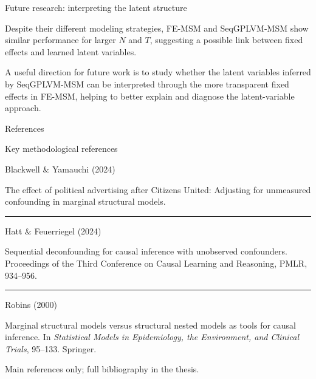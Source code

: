 \documentclass[aspectratio=169,12pt]{beamer}
\newcommand{\teal}[1]{\textcolor{PrimerTeal}{#1}}
\newcommand{\muted}[1]{\textcolor{PrimerMuted}{#1}}
\newcommand{\spacedparagraph}[1]{\par\noindent\begin{minipage}{0.96\linewidth}\RaggedRight #1\end{minipage}\par\vspace{0.55em}}
\begin{document}
\begin{frame}{Future research: interpreting the latent structure}

\vspace{0.15cm}

{\fontsize{11}{15}\selectfont
\spacedparagraph{
Despite their different modeling strategies, FE-MSM and SeqGPLVM-MSM show similar performance for larger \(N\) and \(T\), suggesting a possible link between fixed effects and learned latent variables.
}
\vspace{0.20cm}
\spacedparagraph{
A useful direction for future work is to study whether the latent variables inferred by SeqGPLVM-MSM can be interpreted through the more transparent fixed effects in FE-MSM, helping to better explain and diagnose the latent-variable approach.
}
}

\end{frame}

\begin{frame}{References}

\vspace{-0.05cm}

{\fontsize{10.8}{13.5}\selectfont\teal{Key methodological references}}\par

\vspace{0.30cm}

{\fontsize{8.15}{10.6}\selectfont
\RaggedRight

\noindent
\textcolor{PrimerTeal}{Blackwell \& Yamauchi (2024)}\par
\muted{The effect of political advertising after Citizens United: Adjusting for unmeasured confounding in marginal structural models.}

\vspace{0.22cm}
\textcolor{PrimerRule}{\rule{\linewidth}{0.35pt}}

\vspace{0.22cm}
\noindent
\textcolor{PrimerTeal}{Hatt \& Feuerriegel (2024)}\par
\muted{Sequential deconfounding for causal inference with unobserved confounders. 
Proceedings of the Third Conference on Causal Learning and Reasoning, PMLR, 934--956.}

\vspace{0.22cm}
\textcolor{PrimerRule}{\rule{\linewidth}{0.35pt}}

\vspace{0.22cm}
\noindent
\textcolor{PrimerTeal}{Robins (2000)}\par
\muted{Marginal structural models versus structural nested models as tools for causal inference. 
In \textit{Statistical Models in Epidemiology, the Environment, and Clinical Trials}, 95--133. Springer.}

}

\vfill

{\fontsize{6.4}{8.0}\selectfont
\muted{Main references only; full bibliography in the thesis.}
}

\end{frame}
\end{document}
